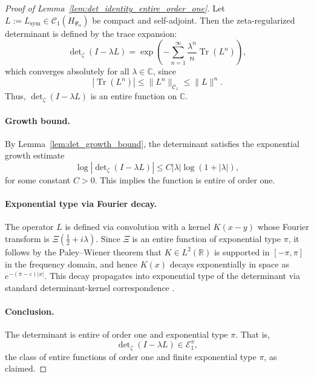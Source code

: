 \begin{proof}[Proof of Lemma~\ref{lem:det_identity_entire_order_one}]
Let \( L := L_{\mathrm{sym}} \in \mathcal{C}_1(H_{\Psi_\alpha}) \) be compact and self-adjoint. Then the zeta-regularized determinant is defined by the trace expansion:
\[
\det\nolimits_\zeta(I - \lambda L)
= \exp\left( - \sum_{n=1}^\infty \frac{\lambda^n}{n} \operatorname{Tr}(L^n) \right),
\]
which converges absolutely for all \( \lambda \in \mathbb{C} \), since
\[
|\operatorname{Tr}(L^n)| \le \|L^n\|_{\mathcal{C}_1} \le \|L\|^n.
\]
Thus, \( \det_\zeta(I - \lambda L) \) is an entire function on \( \mathbb{C} \).

\paragraph{Growth bound.}
By Lemma~\ref{lem:det_growth_bound}, the determinant satisfies the exponential growth estimate
\[
\log \left| \det\nolimits_\zeta(I - \lambda L) \right|
\le C |\lambda| \log(1 + |\lambda|),
\]
for some constant \( C > 0 \). This implies the function is entire of order one.

\paragraph{Exponential type via Fourier decay.}
The operator \( L \) is defined via convolution with a kernel \( K(x-y) \) whose Fourier transform is \( \Xi\left( \tfrac{1}{2} + i\lambda \right) \). Since \( \Xi \) is an entire function of exponential type \( \pi \), it follows by the Paley–Wiener theorem that \( K \in L^2(\mathbb{R}) \) is supported in \( [-\pi, \pi] \) in the frequency domain, and hence \( K(x) \) decays exponentially in space as \( e^{-(\pi - \varepsilon)|x|} \). This decay propagates into exponential type of the determinant via standard determinant-kernel correspondence \cite{Simon2005TraceIdeals}.

\paragraph{Conclusion.}
The determinant is entire of order one and exponential type \( \pi \). That is,
\[
\det\nolimits_\zeta(I - \lambda L) \in \mathcal{E}_1^\pi,
\]
the class of entire functions of order one and finite exponential type \( \pi \), as claimed.
\end{proof}
%  
